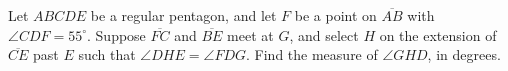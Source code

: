 Let $ABCDE$ be a regular pentagon, and let $F$ be a point on $\overline{AB}$ with $\angle CDF=55^\circ$.  Suppose $\overline{FC}$ and $\overline{BE}$ meet at $G$, and select $H$ on the extension of $\overline{CE}$ past $E$ such that $\angle DHE=\angle FDG$. Find the measure of $\angle GHD$, in degrees.
